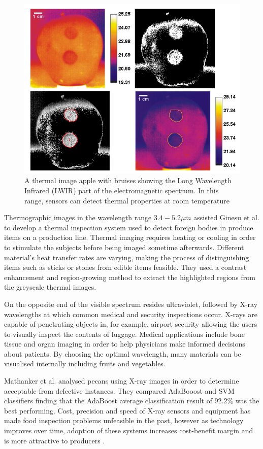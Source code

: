 \documentclass[fleqn,twoside,12pt]{report}
\begin{document}
\begin{figure}[h]
	\centering
	\includegraphics[width=0.8\linewidth]{thermal.png}
	\caption{A thermal image apple with bruises showing the Long Wavelength Infrared (LWIR) part of the electromagnetic spectrum. In this range, sensors can detect thermal properties at room temperature}
	\label{fig:thermal}
\end{figure}%


Thermographic images in the wavelength range $3.4-5.2\mu m$ assisted Ginesu et al.\cite{ginesu} to develop a thermal inspection system used to detect foreign bodies in produce items on a production line. Thermal imaging requires heating or cooling in order to stimulate the subjects before being imaged sometime afterwards. Different material's heat transfer rates are varying, making the process of distinguishing items such as sticks or stones from edible items feasible. They used a contrast enhancement and region-growing method to extract the highlighted regions from the greyscale thermal images.

On the opposite end of the visible spectrum resides ultraviolet, followed by X-ray wavelengths at which common medical and security inspections occur. X-rays are capable of penetrating objects in, for example, airport security allowing the users to visually inspect the contents of luggage. Medical applications include bone tissue and organ imaging in order to help physicians make informed decisions about patients. By choosing the optimal wavelength, many materials can be visualised internally including fruits and vegetables.    

Mathanker et al.\cite{mathanker} analysed pecans using X-ray images in order to determine acceptable from defective instances. They compared AdaBooost and SVM classifiers finding that the AdaBoost average classification result of $92.2\%$ was the best performing. Cost, precision and speed of X-ray sensors and equipment has made food inspection problems unfeasible in the past, however as technology improves over time, adoption of these systems increases cost-benefit margin and is more attractive to producers \cite{haff}.
\end{document}
